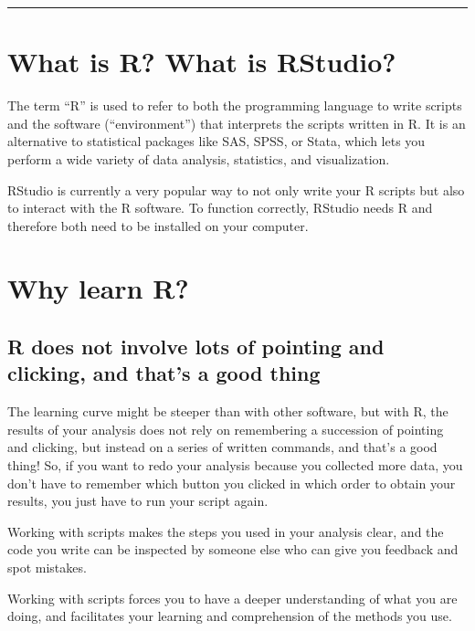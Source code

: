 \documentclass[
]{book}
\begin{document}
\begin{center}\rule{0.5\linewidth}{0.5pt}\end{center}

\hypertarget{what-is-r-what-is-rstudio}{%
\section{What is R? What is RStudio?}\label{what-is-r-what-is-rstudio}}

The term ``R'' is used to refer to both the programming language to write scripts and the software (``environment'') that interprets the scripts written in R. It is an alternative to statistical packages like SAS, SPSS, or Stata, which lets you perform a wide variety of data analysis, statistics, and visualization.

RStudio is currently a very popular way to not only write your R scripts but
also to interact with the R software. To function correctly, RStudio needs R and
therefore both need to be installed on your computer.

\hypertarget{why-learn-r}{%
\section{Why learn R?}\label{why-learn-r}}

\hypertarget{r-does-not-involve-lots-of-pointing-and-clicking-and-thats-a-good-thing}{%
\subsection{R does not involve lots of pointing and clicking, and that's a good thing}\label{r-does-not-involve-lots-of-pointing-and-clicking-and-thats-a-good-thing}}

The learning curve might be steeper than with other software, but with R, the
results of your analysis does not rely on remembering a succession of pointing
and clicking, but instead on a series of written commands, and that's a good
thing! So, if you want to redo your analysis because you collected more data,
you don't have to remember which button you clicked in which order to obtain
your results, you just have to run your script again.

Working with scripts makes the steps you used in your analysis clear, and the
code you write can be inspected by someone else who can give you feedback and
spot mistakes.

Working with scripts forces you to have a deeper understanding of what you are
doing, and facilitates your learning and comprehension of the methods you use.
\end{document}
